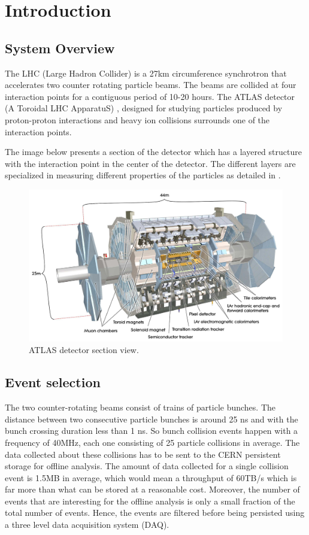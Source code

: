 \chapter{Introduction} %
\label{Capitolul1}

\section*{System Overview}
The LHC (Large Hadron Collider) is a 27km circumference synchrotron that accelerates two counter rotating particle beams. The beams are collided at four interaction points for a contiguous period of 10-20 hours. The ATLAS detector (A Toroidal LHC ApparatuS) \citep{aad2008atlas}, designed for studying particles produced by proton-proton interactions and heavy ion collisions surrounds one of the interaction points. 

The image below presents a section of the detector which has a layered structure with the interaction point in the center of the detector. The different layers are specialized in measuring different properties of the particles as detailed in \citep{aad2008atlas}. 

\begin{figure}[ht!]
\centering
\includegraphics[scale=0.2]{Images/Overview.jpg}
\caption{ATLAS detector section view.}
\end{figure}


\section*{Event selection}
The two counter-rotating beams consist of trains of particle bunches. The distance between two consecutive particle bunches is around 25 ns and with the bunch crossing duration less than 1 ns. So bunch collision events happen with a frequency of 40MHz, each one consisting of 25 particle collisions in average. The data collected about these collisions has to be sent to the CERN persistent storage \citep{baud2003castor} for offline analysis. The amount of data collected for a single collision event is 1.5MB in average, which would mean a throughput of 60TB/s which is far more than what can be stored at a reasonable cost. Moreover, the number of events that are interesting for the offline analysis is only a small fraction of the total number of events. Hence, the events are filtered before being persisted using a three level data acquisition system (DAQ). 

